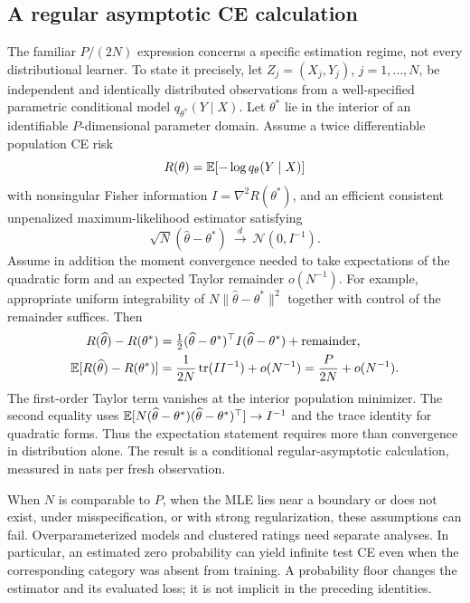 \subsection{A regular asymptotic CE calculation}
The familiar $P/(2N)$ expression concerns a specific estimation regime, not every distributional learner.
To state it precisely, let $Z_j=(X_j,Y_j)$, $j=1,\ldots,N$, be independent and identically distributed observations from a well-specified parametric conditional model $q_{\theta^\ast}(Y\mid X)$.
Let $\theta^\ast$ lie in the interior of an identifiable $P$-dimensional parameter domain.
Assume a twice differentiable population CE risk
\[
 R(\theta)=\mathbb{E}[-\log q_\theta(Y\mid X)]
\]
with nonsingular Fisher information $I=\nabla^2R(\theta^\ast)$, and an efficient consistent unpenalized maximum-likelihood estimator satisfying
\[
 \sqrt N(\widehat\theta-\theta^\ast)\ \xrightarrow{d}\ \mathcal N(0,I^{-1}).
\]
Assume in addition the moment convergence needed to take expectations of the quadratic form and an expected Taylor remainder $o(N^{-1})$.
For example, appropriate uniform integrability of $N\|\widehat\theta-\theta^\ast\|^2$ together with control of the remainder suffices.
Then
\begin{align}
 R(\widehat\theta)-R(\theta^\ast)
 &=\tfrac12(\widehat\theta-\theta^\ast)^\top I(\widehat\theta-\theta^\ast)+\text{remainder},\\
 \mathbb{E}[R(\widehat\theta)-R(\theta^\ast)]
 &=\frac1{2N}\operatorname{tr}(II^{-1})+o(N^{-1})
 =\frac{P}{2N}+o(N^{-1}).\label{eq:asymptotic}
\end{align}
The first-order Taylor term vanishes at the interior population minimizer.
The second equality uses $\mathbb{E}[N(\widehat\theta-\theta^\ast)(\widehat\theta-\theta^\ast)^\top]\to I^{-1}$ and the trace identity for quadratic forms.
Thus the expectation statement requires more than convergence in distribution alone.
The result is a conditional regular-asymptotic calculation, measured in nats per fresh observation.

When $N$ is comparable to $P$, when the MLE lies near a boundary or does not exist, under misspecification, or with strong regularization, these assumptions can fail.
Overparameterized models and clustered ratings need separate analyses.
In particular, an estimated zero probability can yield infinite test CE even when the corresponding category was absent from training.
A probability floor changes the estimator and its evaluated loss; it is not implicit in the preceding identities.

